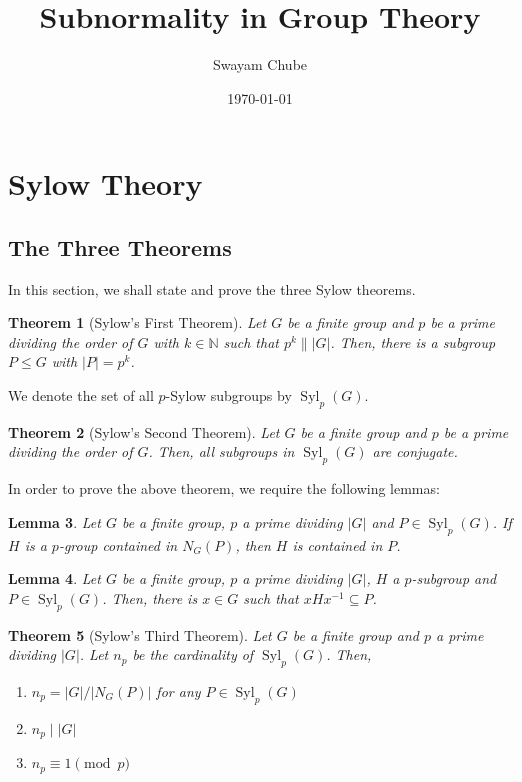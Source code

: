 \documentclass[12pt]{article}
\title{Subnormality in Group Theory}
\author{Swayam Chube}
\date{\today}
\theoremstyle{thmstyle}
\newtheorem{theorem}{Theorem}[section]
\newtheorem{lemma}[theorem]{Lemma}
\theoremstyle{defstyle}
\newcommand{\N}{\mathbb{N}}
\renewcommand{\le}{\leqslant}
\newcommand{\Syl}{\operatorname{Syl}}
\begin{document}
\maketitle

\tableofcontents

\section{Sylow Theory}

\subsection{The Three Theorems}

In this section, we shall state and prove the three Sylow theorems.

\begin{theorem}[Sylow's First Theorem]
    Let $G$ be a finite group and $p$ be a prime dividing the order of $G$ with $k\in\N$ such that $p^k\||G|$. Then, there is a subgroup $P\le G$ with $|P| = p^k$.
\end{theorem}

We denote the set of all $p$-Sylow subgroups by $\Syl_p(G)$.

\begin{theorem}[Sylow's Second Theorem]
    Let $G$ be a finite group and $p$ be a prime dividing the order of $G$. Then, all subgroups in $\Syl_p(G)$ are conjugate.
\end{theorem}

In order to prove the above theorem, we require the following lemmas: 
\begin{lemma}
    Let $G$ be a finite group, $p$ a prime dividing $|G|$ and $P\in\Syl_p(G)$. If $H$ is a $p$-group contained in $N_G(P)$, then $H$ is contained in $P$.
\end{lemma}

\begin{lemma}
    Let $G$ be a finite group, $p$ a prime dividing $|G|$, $H$ a $p$-subgroup and $P\in\Syl_p(G)$. Then, there is $x\in G$ such that $xHx^{-1}\subseteq P$.
\end{lemma}

\begin{theorem}[Sylow's Third Theorem]
    Let $G$ be a finite group and $p$ a prime dividing $|G|$. Let $n_p$ be the cardinality of $\Syl_p(G)$. Then, 
    \begin{enumerate}
        \item $n_p = |G|/|N_G(P)|$ for any $P\in\Syl_p(G)$
        \item $n_p\mid |G|$
        \item $n_p\equiv1\pmod p$
    \end{enumerate}
\end{theorem}
\end{document}
